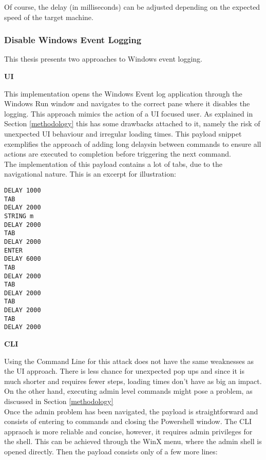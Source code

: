 Of course, the delay (in milliseconds) can be adjusted depending on the expected speed of the target machine. 





\subsubsection{Disable Windows Event Logging}

This thesis presents two approaches to Windows event logging.

\textbf{UI} 

This implementation opens the Windows Event log application through the Windows Run window and navigates to the correct pane where it disables the logging.
This approach mimics the action of a UI focused user. As explained in Section \ref{methodology} this has some drawbacks attached to it, namely the risk of unexpected UI behaviour and irregular loading times. This payload snippet exemplifies the approach of adding long delaysin between commands to ensure all actions are executed to completion before triggering the next command.\\
The implementation of this payload contains a lot of tabs, due to the navigational nature. This is an excerpt for illustration:

\begin{lstlisting}[caption={Exceprt: disable Windows Event Logging by navigating UI}, captionpos=b]
DELAY 1000
TAB
DELAY 2000
STRING m
DELAY 2000
TAB
DELAY 2000
ENTER
DELAY 6000
TAB
DELAY 2000
TAB
DELAY 2000
TAB
DELAY 2000
TAB
DELAY 2000
\end{lstlisting}

\textbf{CLI}

Using the Command Line for this attack does not have the same weaknesses as the UI approach. There is less chance for unexpected pop ups and since it is much shorter and requires fewer steps, loading times don't have as big an impact. On the other hand, executing admin level commands might pose a problem, as discussed in Section \ref{methodology} \\

Once the admin problem has been navigated, the payload is straightforward and consists of entering to commands and closing the Powershell window.
The CLI appraoch is more reliable and concise, however, it requires admin privileges for the shell. This can be achieved through the WinX menu, where the admin shell is opened directly. Then the payload consists only of a few more lines:

